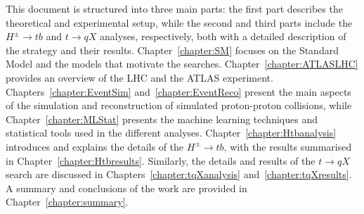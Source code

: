 This document is structured into three main parts: the first part describes the theoretical and experimental setup, while the second and third parts include the $H^\pm\to tb$ and $t\to qX$ analyses, respectively, both with a detailed description of the strategy and their results. Chapter~\ref{chapter:SM} focuses on the Standard Model and the models that motivate the searches. Chapter~\ref{chapter:ATLASLHC} provides an overview of the LHC and the ATLAS experiment. Chapters~\ref{chapter:EventSim} and~\ref{chapter:EventReco} present the main aspects of the simulation and reconstruction of simulated proton-proton collisions, while Chapter~\ref{chapter:MLStat} presents the machine learning techniques and statistical tools used in the different analyses. Chapter~\ref{chapter:Htbanalysis} introduces and explains the details of the $H^\pm\to tb$, with the results summarised in Chapter~\ref{chapter:Htbresults}. Similarly, the details and results of the $t\to qX$ search are discussed in Chapters~\ref{chapter:tqXanalysis} and~\ref{chapter:tqXresults}. A summary and conclusions of the work are provided in Chapter~\ref{chapter:summary}.